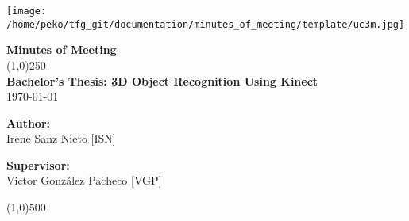 \documentclass{article}
\begin{document}
\texttt{[image: /home/peko/tfg\_git/documentation/minutes\_of\_meeting/template/uc3m.jpg]}


\vspace{-1cm}
\begin{minipage}[b]{1\linewidth}
	\begin{center}
	{\Huge \bfseries{Minutes of Meeting}}\\
	\line(1,0){250}\\[1cm]
	{\LARGE \textbf{Bachelor's Thesis: 3D Object Recognition Using Kinect}}\\[0.5cm]
	{\large \today}
	\end{center}
\end {minipage}



\begin{minipage}{0.55\textwidth}
\begin{flushleft} \large
\textbf{{Author:}\\}
Irene Sanz Nieto [ISN]\\
\end{flushleft}
\end{minipage}
\begin{minipage}{0.4\textwidth}
\begin{flushright} \large
\textbf{Supervisor: }\\
Victor González Pacheco [VGP]
\end{flushright}\end{minipage}

\begin{center}
\line(1,0){500}
\end{center}
\vspace{1cm}

\end{document}
